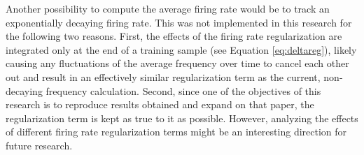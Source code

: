 		Another possibility to compute the average firing rate would be to track an exponentially decaying firing rate.
		This was not implemented in this research for the following two reasons. First, the effects of the firing rate regularization are integrated only at the end of a training sample (see Equation \ref{eq:deltareg}), likely causing any fluctuations of the average frequency over time to cancel each other out and result in an effectively similar regularization term as the current, non-decaying frequency calculation.
		Second, since one of the objectives of this research is to reproduce results obtained \citet{bellec2020solution} and expand on that paper, the regularization term is kept as true to it as possible.
		However, analyzing the effects of different firing rate regularization terms might be an interesting direction for future research.

